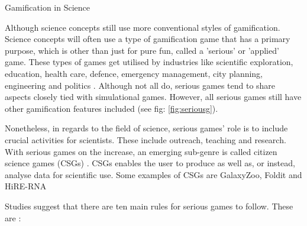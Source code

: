 	Gamification in Science
	\label{sec:game_in_science}
	
	Although science concepts still use more conventional styles of gamification. Science concepts will often use a type of gamification game that has a primary purpose, which is other than just for pure fun, called a 'serious' or 'applied' game. These types of games get utilised by industries like scientific exploration, education, health care, defence, emergency management, city planning, engineering and politics \cite{wikiserious}. Although not all do, serious games tend to share aspects closely tied with simulational games. However, all serious games still have other gamification features included (see fig: \ref{fig:seriousg}).
	
	Nonetheless, in regards to the field of science, serious games' role is to include crucial activities for scientists. These include outreach, teaching and research. With serious games on the increase, an emerging sub-genre is called citizen science games (CSGs) \cite{10seriousrules}. CSGs enables the user to produce as well as, or instead, analyse data for scientific use. Some examples of CSGs are GalaxyZoo, Foldit and HiRE-RNA \cite{follett2015analysis,mazzanti2017can}
	
	Studies suggest that there are ten main rules for serious games to follow. These are \cite{10seriousrules}:
	
